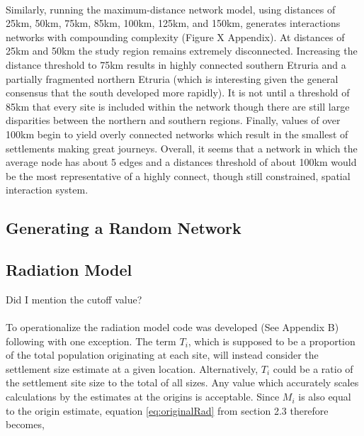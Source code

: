 \documentclass[12pt,a4paper]{thesis}
\begin{document}
\paragraph{}
Similarly, running the maximum-distance network model, using distances of 25km, 50km, 75km, 85km, 100km, 125km, and 150km, generates interactions networks with compounding complexity (Figure X Appendix). At distances of 25km and 50km the study region remains extremely disconnected. Increasing the distance threshold to 75km results in highly connected southern Etruria and a partially fragmented northern Etruria (which is interesting given the general consensus that the south developed more rapidly). It is not until a threshold of 85km that every site is included within the network though there are still large disparities between the northern and southern regions. Finally, values of over 100km begin to yield overly connected networks which result in the smallest of settlements making great journeys. Overall, it seems that a network in which the average node has about 5 edges and a distances threshold of about 100km would be the most representative of a highly connect, though still constrained, spatial interaction system.  

\subsection{Generating a Random Network} 
\paragraph{}


 

\subsection{Radiation Model}
 Did I mention the cutoff value?
\paragraph{}
To operationalize the radiation model code was developed (See Appendix B) following \cite{Bar12} with one exception. The term  $T_{i}$, which is supposed to be a proportion of the total population originating at each site, will instead consider the settlement size estimate at a given location. Alternatively, $T_{i}$ could be a ratio of the settlement site size to the total of all sizes. Any value which accurately scales calculations by the estimates at the origins is acceptable. Since $M_{i}$ is also equal to the origin estimate, equation \ref{eq:originalRad} from section 2.3 therefore becomes,
						
\end{document}

